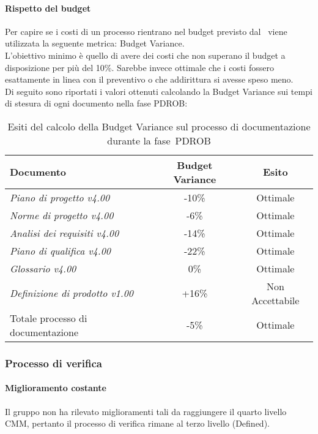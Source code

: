 \documentclass[../PianoDiQualifica.tex]{subfiles}
\begin{document}
\begin{appendices}
			\paragraph{Rispetto del budget}
			Per capire se i costi di un processo rientrano nel budget previsto dal \pianodiprogetto\ viene utilizzata la seguente metrica: Budget Variance.\\
			L'obiettivo minimo è quello di avere dei costi che non superano il budget a disposizione per più del 10\%. Sarebbe invece ottimale che i costi fossero esattamente in linea con il preventivo o che addirittura si avesse speso meno.\\
			Di seguito sono riportati i valori ottenuti calcolando la Budget Variance sui tempi di stesura di ogni documento nella fase PDROB:
			\begin{table}[H]
				\centering
				\begin{tabular}{l * {2}{c}}
					\toprule
					\textbf{Documento} & \textbf{Budget Variance} & \textbf{Esito} \\
					\midrule
					\textit{Piano di progetto v4.00} & -10\% &  Ottimale \\
					\textit{Norme di progetto v4.00} & -6\% & Ottimale \\
					\textit{Analisi dei requisiti v4.00} & -14\% & Ottimale \\
					\textit{Piano di qualifica v4.00} & -22\% & Ottimale \\
					\textit{Glossario v4.00} & 0\% & Ottimale \\
					\textit{Definizione di prodotto v1.00} & +16\% & Non Accettabile \\
					Totale processo di documentazione & -5\% & Ottimale \\
					\bottomrule
				\end{tabular}
				\caption{Esiti del calcolo della Budget Variance sul processo di documentazione durante la fase\g\ PDROB}
				\label{tab:esiti_budget_variance}
			\end{table}
						
		\subsubsection{Processo di verifica}
			\paragraph{Miglioramento costante}
			Il gruppo non ha rilevato miglioramenti tali da raggiungere il quarto livello CMM, pertanto il processo di verifica rimane al terzo livello (Defined).
			

\end{appendices}
\end{document}
